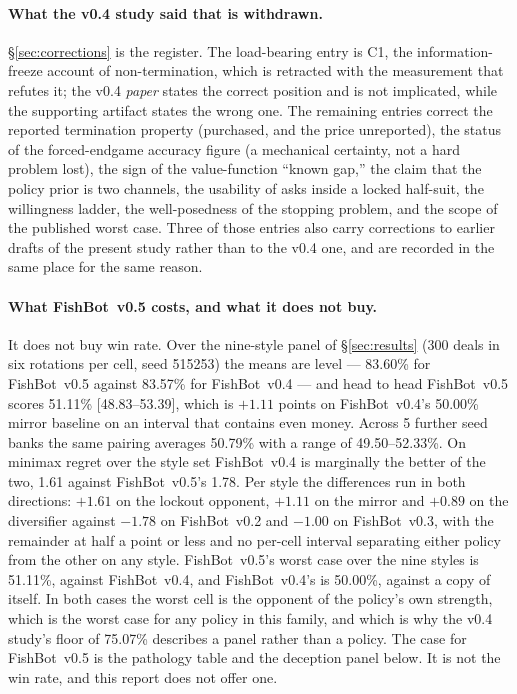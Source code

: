 \documentclass[11pt]{article}
\theoremstyle{definition}
\DeclareRobustCommand{\vfive}{\texorpdfstring{\mbox{FishBot v0.5}}{FishBot v0.5}}
\DeclareRobustCommand{\vfour}{\texorpdfstring{\mbox{FishBot v0.4}}{FishBot v0.4}}
\DeclareRobustCommand{\vthree}{\texorpdfstring{\mbox{FishBot v0.3}}{FishBot v0.3}}
\DeclareRobustCommand{\vtwo}{\texorpdfstring{\mbox{FishBot v0.2}}{FishBot v0.2}}
\providecommand{\numVfourVsVthree}{75.07}
\providecommand{\numHeadWin}{50.79}
\providecommand{\numHeadRange}{49.50--52.33}
\providecommand{\numHeadSeeds}{5}
\providecommand{\numStyleDeals}{300}
\providecommand{\numStyleSeed}{515253}
\providecommand{\numStyleCIVfour}{48.83--53.39}
\providecommand{\numPanelVfiveVfour}{51.11}
\providecommand{\numDeltaVfour}{+1.11}
\providecommand{\numDeltaVthree}{-1.00}
\providecommand{\numDeltaVtwo}{-1.78}
\providecommand{\numDeltaLockout}{+1.61}
\providecommand{\numDeltaDiversifier}{+0.89}
\providecommand{\numVfiveMean}{83.60}
\providecommand{\numVfourMean}{83.57}
\providecommand{\numVfiveWorst}{51.11}
\providecommand{\numVfourWorst}{50.00}
\providecommand{\numVfiveRegret}{1.78}
\providecommand{\numVfourRegret}{1.61}
\providecommand{\numPanelVfourVfour}{50.00}
\begin{document}
\paragraph{What the v0.4 study said that is withdrawn.}
\S\ref{sec:corrections} is the register. The load-bearing entry is C1, the
information-freeze account of non-termination, which is retracted with the
measurement that refutes it; the v0.4 \emph{paper} states the correct position
and is not implicated, while the supporting artifact states the wrong one. The
remaining entries correct the reported termination property (purchased, and the
price unreported), the status of the forced-endgame accuracy figure (a
mechanical certainty, not a hard problem lost), the sign of the value-function
``known gap,'' the claim that the policy prior is two channels, the usability of
asks inside a locked half-suit, the willingness ladder, the well-posedness of the
stopping problem, and the scope of the published worst case. Three of those
entries also carry corrections to earlier drafts of the present study rather
than to the v0.4 one, and are recorded in the same place for the same reason.

\paragraph{What \vfive{} costs, and what it does not buy.} It does not buy win
rate. Over the nine-style panel of \S\ref{sec:results}
(\numStyleDeals{} deals in six rotations per cell, seed \numStyleSeed{}) the
means are level --- \numVfiveMean\% for \vfive{} against \numVfourMean\% for
\vfour{} --- and head to head \vfive{} scores \numPanelVfiveVfour\%
[\numStyleCIVfour], which is $\numDeltaVfour$ points on \vfour{}'s
\numPanelVfourVfour\% mirror baseline on an interval that contains even money.
Across \numHeadSeeds{} further seed banks the same pairing averages \numHeadWin\%
with a range of \numHeadRange\%. On minimax regret over the style set \vfour{} is
marginally the better of the two, \numVfourRegret{} against \vfive{}'s
\numVfiveRegret{}. Per style the differences run in both directions:
$\numDeltaLockout$ on the lockout opponent, $\numDeltaVfour$ on the mirror and
$\numDeltaDiversifier$ on the diversifier against $\numDeltaVtwo$ on \vtwo{} and
$\numDeltaVthree$ on \vthree{}, with the remainder at half a point or less and no
per-cell interval separating either policy from the other on any style.
\vfive{}'s worst case over the nine styles is \numVfiveWorst\%, against \vfour{},
and \vfour{}'s is \numVfourWorst\%, against a copy of itself. In both cases the
worst cell is the opponent of the policy's own strength, which is the worst case
for any policy in this family, and which is why the v0.4 study's floor of
\numVfourVsVthree\% describes a panel rather than a policy. The case for \vfive{} is the pathology table and the
deception panel below. It is not the win rate, and this report does not offer
one.
\end{document}

